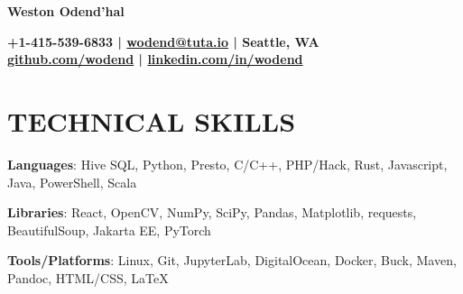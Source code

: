 \documentclass{article}
\makeatletter
\newcommand{\beginResumeList}{\begin{itemize}\setlength\itemsep{0em}\begin{minipage}{0.9\textwidth}}
\newcommand{\resumeListEnd}{\end{minipage}\end{itemize}}
\newcommand{\boldItem}[2]{\normalsize\item{\textbf{#1}{: #2}}}
\newcommand{\social}[3]{
  \begin{tabular*}{0.8\textwidth}[t]{l@{\extracolsep{\fill}} c@{\extracolsep{\fill}} r}
    \normalsize{#1} & \normalsize{#2}
  \end{tabular*}
}
\makeatother
\begin{document}
  \centering\huge\textbf{Weston Odend'hal}
  \vspace*{0.1in}

  \normalsize \textbf{+1-415-539-6833 | \href{mailto:wodend@tuta.io}{wodend@tuta.io} | Seattle, WA} \\
  \normalsize \textbf{\href{https://github.com/wodend/}{github.com/wodend} | \href{https://www.linkedin.com/in/wodend/}{linkedin.com/in/wodend} }
  \vspace*{0.1in}


  \section{TECHNICAL SKILLS}
  \beginResumeList
  \boldItem{Languages}{Hive SQL, Python, Presto, C/C++, PHP/Hack, Rust, Javascript, Java, PowerShell, Scala}
  \boldItem{Libraries}{React, OpenCV, NumPy, SciPy, Pandas, Matplotlib, requests, BeautifulSoup, Jakarta EE, PyTorch}
  \boldItem{Tools/Platforms}{Linux, Git, JupyterLab, DigitalOcean, Docker, Buck, Maven, Pandoc, HTML/CSS, \LaTeX}
  \resumeListEnd
\end{document}
